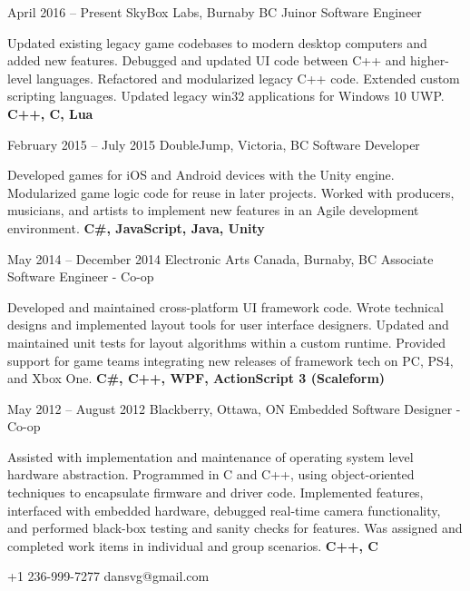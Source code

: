 \documentclass[10pt]{tccv}
\begin{document}
\begin{eventlist}

\item{April 2016 -- Present}
     {SkyBox Labs, Burnaby BC}
     {Juinor Software Engineer}

Updated existing legacy game codebases to modern desktop computers and added new features. Debugged and updated UI code between C++ and higher-level languages. Refactored and modularized legacy C++ code. Extended custom scripting languages. Updated legacy win32 applications for Windows 10 UWP.  \textbf{C++, C, Lua}

\item{February 2015 -- July 2015}
     {DoubleJump, Victoria, BC}
     {Software Developer}
     
Developed games for iOS and Android devices with the Unity engine. Modularized game logic code for reuse in later projects. Worked with producers, musicians, and artists to implement new features in an Agile development environment. \textbf{C\#, JavaScript, Java, Unity}

\item{May 2014 -- December 2014}
     {Electronic Arts Canada, Burnaby, BC}
     {Associate Software Engineer - Co-op}

Developed and maintained cross-platform UI framework code. Wrote technical designs and implemented layout tools for user interface designers. Updated and maintained unit tests for layout algorithms within a custom runtime. Provided support for game teams integrating new releases of framework tech on PC, PS4, and Xbox One. \textbf{C\#, C++, WPF, ActionScript 3 (Scaleform)}

\item{May 2012 -- August 2012}
     {Blackberry, Ottawa, ON}
     {Embedded Software Designer - Co-op}

Assisted with implementation and maintenance of operating system level hardware abstraction. Programmed in C and C++, using object-oriented techniques to encapsulate firmware and driver code. Implemented features, interfaced with embedded hardware, debugged real-time camera functionality, and performed black-box testing and sanity checks for features. Was assigned and completed work items in individual and group scenarios. \textbf{C++, C}

\end{eventlist}

    {+1 236-999-7277}
    {dansvg@gmail.com}
\end{document}

